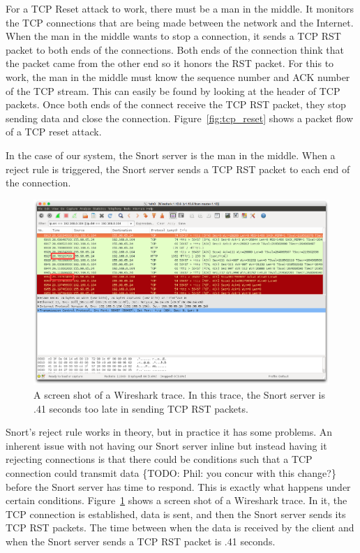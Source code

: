 For a TCP Reset attack to work, there must be a man in the middle. It monitors
the TCP connections that are being made between the network and the Internet.
When the man in the middle wants to stop a connection, it sends a TCP RST packet
to both ends of the connections. Both ends of the connection think that the
packet came from the other end so it honors the RST packet. For this to work,
the man in the middle must know the sequence number and ACK number of the TCP
stream. This can easily be found by looking at the header of TCP packets. Once
both ends of the connect receive the TCP RST packet, they stop sending data and
close the connection. Figure~\ref{fig:tcp_reset} shows a packet flow of a TCP
reset attack.

In the case of our system, the Snort server is the man in the middle. When a
reject rule is triggered, the Snort server sends a TCP RST packet to each end
of the connection.

\begin{figure}[!hbtp]
    \centering
    \includegraphics[width=2\columnwidth]{figures/snort_slow}
    \caption{A screen shot of a Wireshark trace. In this trace, the Snort
    server is .41 seconds too late in sending TCP RST packets.}
    \label{fig:snort_slow}
\end{figure}

Snort's reject rule works in theory, but in practice it has some problems. 
%
An inherent issue with not having our Snort server inline but instead having
it rejecting connections is that there could be conditions such that a TCP
connection could transmit data \{TODO: Phil: you concur with this change?\} before the Snort server
has time to respond.
%
This is exactly what happens under certain conditions.
%
Figure~\ref{fig:snort_slow} shows a screen shot of a Wireshark trace.
%
In it, the TCP connection is established, data is sent, and then the Snort
server sends its TCP RST packets.
%
The time between when the data is received by the client and when the Snort
server sends a TCP RST packet is .41 seconds.

